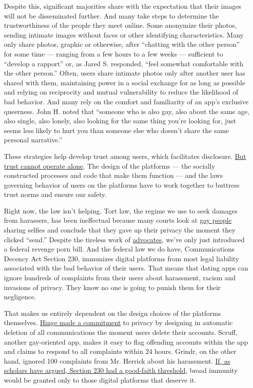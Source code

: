 Despite this, significant majorities share with the expectation that
their images will not be disseminated further. And many take steps to
determine the trustworthiness of the people they meet online. Some
anonymize their photos, sending intimate images without faces or other
identifying characteristics. Many only share photos, graphic or
otherwise, after ``chatting with the other person'' for some time ---
ranging from a few hours to a few weeks --- sufficient to ``develop a
rapport'' or, as Jared S. responded, ``feel somewhat comfortable with
the other person.'' Often, users share intimate photos only after
another user has shared with them, maintaining power in a social
exchange for as long as possible and relying on reciprocity and mutual
vulnerability to reduce the likelihood of bad behavior. And many rely on
the comfort and familiarity of an app's exclusive queerness. John H.
noted that ``someone who is also gay, also about the same age, also
single, also lonely, also looking for the same thing you're looking for,
just seems less likely to hurt you than someone else who doesn't share
the same personal narrative.''

These strategies help develop trust among users, which facilitates
disclosure.
\href{https://papers.ssrn.com/sol3/papers.cfm?abstract_id=3278719}{But
trust cannot operate alone}. The design of the platforms --- the
socially constructed processes and code that make them function --- and
the laws governing behavior of users on the platforms have to work
together to buttress trust norms and ensure our safety.

Right now, the law isn't helping. Tort law, the regime we use to seek
damages from harassers, has been ineffectual because many courts look at
\href{https://www.law.uw.edu/wlr/print-edition/print-edition/vol-93/4/skinner-thompson}{gay
people} sharing selfies and conclude that they gave up their privacy the
moment they clicked ``send.'' Despite the tireless work of
\href{https://www.cybercivilrights.org/}{advocates}, we've only just
introduced a federal revenge porn bill. And the federal law we do have,
Communications Decency Act Section 230, immunizes digital platforms from
most legal liability associated with the bad behavior of their users.
That means that dating apps can ignore hundreds of complaints from their
users about harassment, racism and invasions of privacy. They know no
one is going to punish them for their negligence.

That makes us entirely dependent on the design choices of the platforms
themselves.
\href{https://slate.com/human-interest/2019/04/pete-chasten-buttigieg-hinge-marriage-dating-app-president.html}{Hinge
made a commitment} to privacy by designing in automatic deletion of all
communications the moment users delete their accounts. Scruff, another
gay-oriented app, makes it easy to flag offending accounts within the
app and claims to respond to all complaints within 24 hours. Grindr, on
the other hand, ignored 100 complaints from Mr. Herrick about his
harassment. \href{https://ir.lawnet.fordham.edu/flr/vol86/iss2/3/}{If,
as scholars have argued, Section 230 had a good-faith threshold}, broad
immunity would be granted only to those digital platforms that deserve
it.

